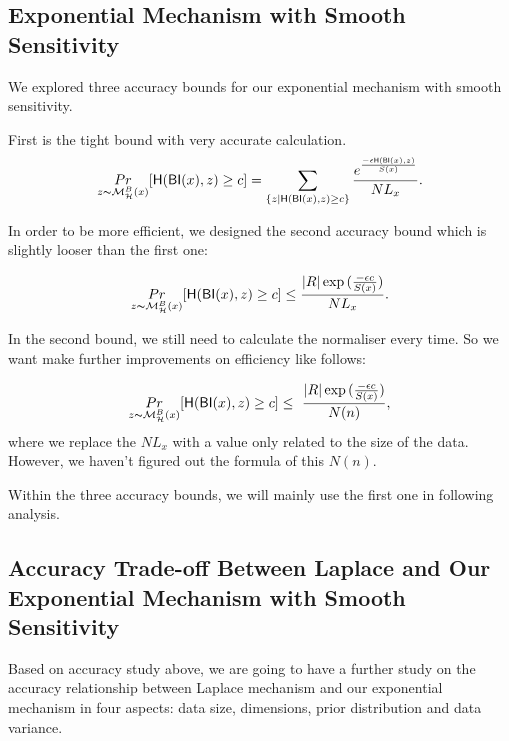 \documentclass[sigconf, anonymous]{acmart}
\begin{document}
\subsection{Exponential Mechanism with Smooth Sensitivity}
\label{subsec_accuracy_smoo}
We explored three accuracy bounds for our exponential mechanism with smooth sensitivity.

First is the tight bound with very accurate calculation.
\begin{equation*}
\underset{z \thicksim \mathcal{M}^{B}_{\mathcal{H}}(x)}{Pr}[ \mathsf{H}(\mathsf{BI}(x), z) \geq c] = \sum\limits_{\{z | \mathsf{H}(\mathsf{BI}(x), z) \geq c\}} \frac{e^{\frac{- \epsilon \mathsf{H}(\mathsf{BI}(x), z)}{S(x)}}}{NL_x}.
\end{equation*}

In order to be more efficient, we designed the second accuracy bound which is slightly looser than the first one:

\begin{equation*}
\underset{z \thicksim \mathcal{M}^{B}_{\mathcal{H}}(x)}{Pr}[ \mathsf{H}(\mathsf{BI}(x), z) \geq c] \leq \frac{|R| \exp{(\frac{- \epsilon c}{S(x)}})}{NL_x}.
\end{equation*}

In the second bound, we still need to calculate the normaliser every time. So we want make further improvements on efficiency like follows:

\begin{equation*}
\underset{z \thicksim \mathcal{M}^{B}_{\mathcal{H}}(x)}{Pr}[ \mathsf{H}(\mathsf{BI}(x), z) \geq c] \leq \ \frac{|R| \exp{(\frac{- \epsilon c}{S(x)}})}{N(n)},
\end{equation*}
where we replace the $NL_x$ with a value only related to the size of the data. However, we haven't figured out the formula of this $N(n)$.

Within the three accuracy bounds, we will mainly use the first one in following analysis.


\subsection{Accuracy Trade-off Between Laplace and Our Exponential Mechanism with Smooth Sensitivity}
\label{subsec_accuracy_tradeoff}
Based on accuracy study above, we are going to have a further study on the accuracy relationship between Laplace mechanism and our exponential mechanism in four aspects: data size, dimensions, prior distribution and data variance.
\end{document}
